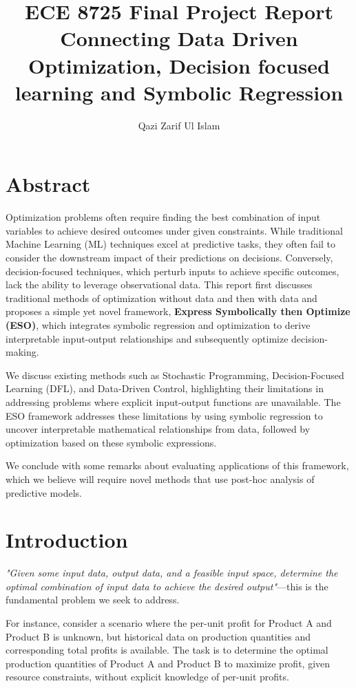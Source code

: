 \documentclass[12pt, letterpaper]{article}
\title{ECE 8725 Final Project Report\\
    \large Connecting Data Driven Optimization, Decision focused learning and Symbolic Regression}
\author{Qazi Zarif Ul Islam}
\begin{document}
\maketitle

\section{Abstract}
Optimization problems often require finding the best combination of input
variables to achieve desired outcomes under given constraints. While traditional
Machine Learning (ML) techniques excel at predictive tasks, they often fail to
consider the downstream impact of their predictions on decisions. Conversely,
decision-focused techniques, which perturb inputs to achieve specific outcomes,
lack the ability to leverage observational data. This report first discusses
traditional methods of optimization without data and then with data and proposes
a simple yet novel framework, \textbf{Express Symbolically then Optimize (ESO)},
which integrates symbolic regression and optimization to derive interpretable
input-output relationships and subsequently optimize decision-making.

We discuss existing methods such as Stochastic Programming, Decision-Focused
Learning (DFL), and Data-Driven Control, highlighting their limitations in
addressing problems where explicit input-output functions are unavailable. The
ESO framework addresses these limitations by using symbolic regression to
uncover interpretable mathematical relationships from data, followed by
optimization based on these symbolic expressions. 

We conclude with some remarks about evaluating applications of this framework,
which we believe will require novel methods that use post-hoc analysis of
predictive models. 

\section{Introduction}


\textit{"Given some input data, output data, and a feasible input space, determine the optimal combination of input data to achieve the desired output"}—this is the fundamental problem we seek to address. 

For instance, consider a scenario where the per-unit profit for Product A and
Product B is unknown, but historical data on production quantities and
corresponding total profits is available. The task is to determine the optimal
production quantities of Product A and Product B to maximize profit, given
resource constraints, without explicit knowledge of per-unit profits.
\end{document}
